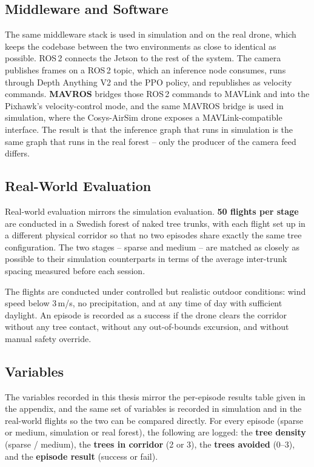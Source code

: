 \documentclass[../main.tex]{subfiles}
\begin{document}


\subsection{Middleware and Software}

The same middleware stack is used in simulation and on the real drone, which keeps the codebase between the two environments as close to identical as possible. ROS\,2 connects the Jetson to the rest of the system. The camera publishes frames on a ROS\,2 topic, which an inference node consumes, runs through Depth Anything V2 and the PPO policy, and republishes as velocity commands. \textbf{MAVROS} bridges those ROS\,2 commands to MAVLink and into the Pixhawk's velocity-control mode, and the same MAVROS bridge is used in simulation, where the Cosys-AirSim drone exposes a MAVLink-compatible interface. The result is that the inference graph that runs in simulation is the same graph that runs in the real forest -- only the producer of the camera feed differs.



\subsection{Real-World Evaluation}

Real-world evaluation mirrors the simulation evaluation. \textbf{50 flights per stage} are conducted in a Swedish forest of naked tree trunks, with each flight set up in a different physical corridor so that no two episodes share exactly the same tree configuration. The two stages -- sparse and medium -- are matched as closely as possible to their simulation counterparts in terms of the average inter-trunk spacing measured before each session.

The flights are conducted under controlled but realistic outdoor conditions: wind speed below $3$\,m/s, no precipitation, and at any time of day with sufficient daylight. An episode is recorded as a success if the drone clears the corridor without any tree contact, without any out-of-bounds excursion, and without manual safety override.

\subsection{Variables}

The variables recorded in this thesis mirror the per-episode results table given in the appendix, and the same set of variables is recorded in simulation and in the real-world flights so the two can be compared directly. For every episode (sparse or medium, simulation or real forest), the following are logged: the \textbf{tree density} (sparse / medium), the \textbf{trees in corridor} (2 or 3), the \textbf{trees avoided} (0--3), and the \textbf{episode result} (success or fail).
\end{document}
